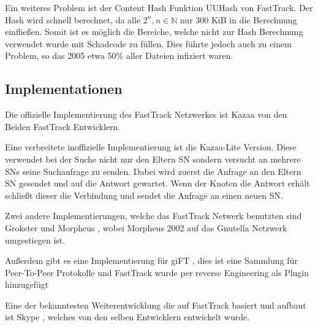 Ein weiteres Problem ist der Content Hash Funktion UUHash \cite{uuHash} von FastTrack.
Der Hash wird schnell berechnet, da alle $2^n, n \in \mathbb{N}$ nur 300 KiB in die Berechnung einfließen.
Somit ist es möglich die Bereiche, welche nicht zur Hash Berechnung verwendet wurde mit Schadcode zu füllen.
Dies führte jedoch auch zu einem Problem, so das 2005 etwa 50\% aller Dateien infiziert waren. \cite{menneck2} 


\subsection{Implementationen}
\label{subsec:impl}

Die offizielle Implementierung des FastTrack Netzwerkes ist Kazaa \cite{kazaa} von den Beiden FastTrack Entwicklern.

Eine verbreitete inoffizielle Implementierung ist die Kazaa-Lite \cite{kazaaLite} Version.
Diese verwendet bei der Suche nicht nur den Eltern SN sondern versucht an mehrere SNs seine Suchanfrage zu senden.
Dabei wird zuerst die Anfrage an den Eltern SN gesendet und auf die Antwort gewartet.
Wenn der Knoten die Antwort erhält schließt dieser die Verbindung und sendet die Anfrage an einen neuen SN.\cite{liang2006fasttrack}

Zwei andere Implementierungen, welche das FastTrack Netwerk benutzten sind Grokster \cite{grokster} und Morpheus \cite{morpheus}, wobei Morpheus 2002 auf das Gnutella \cite{gnutella} Netzwerk umgestiegen ist. \cite{morphvsKazaa}

Außerdem gibt es eine Implementierung für giFT \cite{gift}, dies ist eine Sammlung für Peer-To-Peer Protokolle und FastTrack wurde per reverse Engineering als Plugin hinzugefügt \cite{liang2006fasttrack}

Eine der bekanntesten Weiterentwicklung die auf FastTrack basiert und aufbaut ist Skype \cite{skypeAna}, welches von den selben Entwicklern entwickelt wurde.